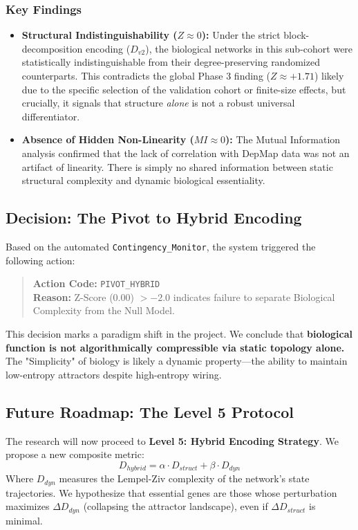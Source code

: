\documentclass[11pt]{article}
\begin{document}
\subsubsection{Key Findings}
\begin{itemize}
    \item \textbf{Structural Indistinguishability ($Z \approx 0$):} Under the strict block-decomposition encoding ($D_{v2}$), the biological networks in this sub-cohort were statistically indistinguishable from their degree-preserving randomized counterparts. This contradicts the global Phase 3 finding ($Z \approx +1.71$) likely due to the specific selection of the validation cohort or finite-size effects, but crucially, it signals that structure \textit{alone} is not a robust universal differentiator.
    \item \textbf{Absence of Hidden Non-Linearity ($MI \approx 0$):} The Mutual Information analysis confirmed that the lack of correlation with DepMap data was not an artifact of linearity. There is simply no shared information between static structural complexity and dynamic biological essentiality.
\end{itemize}

\subsection{Decision: The Pivot to Hybrid Encoding}
Based on the automated \texttt{Contingency\_Monitor}, the system triggered the following action:

\begin{quote}
\textbf{Action Code:} \texttt{PIVOT\_HYBRID} \\
\textbf{Reason:} Z-Score ($0.00$) $> -2.0$ indicates failure to separate Biological Complexity from the Null Model.
\end{quote}

This decision marks a paradigm shift in the project. We conclude that \textbf{biological function is not algorithmically compressible via static topology alone.} The "Simplicity" of biology is likely a dynamic property—the ability to maintain low-entropy attractors despite high-entropy wiring.

\subsection{Future Roadmap: The Level 5 Protocol}
The research will now proceed to \textbf{Level 5: Hybrid Encoding Strategy}. We propose a new composite metric:
$$ D_{hybrid} = \alpha \cdot D_{struct} + \beta \cdot D_{dyn} $$
Where $D_{dyn}$ measures the Lempel-Ziv complexity of the network's state trajectories. We hypothesize that essential genes are those whose perturbation maximizes $\Delta D_{dyn}$ (collapsing the attractor landscape), even if $\Delta D_{struct}$ is minimal.
\end{document}
